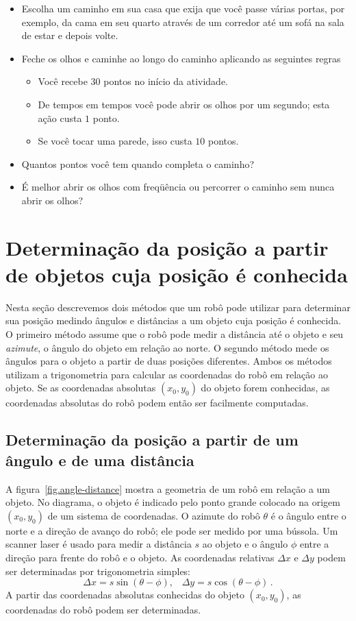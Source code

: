 \begin{framed}
\begin{itemize}
\item Escolha um caminho em sua casa que exija que você passe várias portas, por exemplo, da cama em seu quarto através de um corredor até um sofá na sala de estar e depois volte.
\item Feche os olhos e caminhe ao longo do caminho aplicando as seguintes regras
\begin{itemize}
\item Você recebe $30$ pontos no início da atividade.
\item De tempos em tempos você pode abrir os olhos por um segundo; esta ação custa $1$ ponto.
\item Se você tocar uma parede, isso custa $10$ pontos.
\end{itemize}
\item Quantos pontos você tem quando completa o caminho?
\item É melhor abrir os olhos com freqüência ou percorrer o caminho sem nunca abrir os olhos?
\end{itemize}
\end{framed}

\section{Determinação da posição a partir de objetos cuja posição é conhecida}\label{s.known-points}

Nesta seção descrevemos dois métodos que um robô pode utilizar para determinar sua posição medindo ângulos e distâncias a um objeto cuja posição é conhecida. O primeiro método assume que o robô pode medir a distância até o objeto e seu \emph{azimute}, o ângulo do objeto em relação ao norte. O segundo método mede os ângulos para o objeto a partir de duas posições diferentes. Ambos os métodos utilizam a trigonometria para calcular as coordenadas do robô em relação ao objeto. Se as coordenadas absolutas $(x_0,y_0)$ do objeto forem conhecidas, as coordenadas absolutas do robô podem então ser facilmente computadas.

\subsection{Determinação da posição a partir de um ângulo e de uma distância}

A figura~\ref{fig.angle-distance} mostra a geometria de um robô em relação a um objeto. No diagrama, o objeto é indicado pelo ponto grande colocado na origem $(x_0,y_0)$ de um sistema de coordenadas. O azimute do robô $\theta$ é o ângulo entre o norte e a direção de avanço do robô; ele pode ser medido por uma bússola. Um scanner laser é usado para medir a distância $s$ ao objeto e o ângulo $\phi$ entre a direção para frente do robô e o objeto. As coordenadas relativas $\Delta x$ e $\Delta y$ podem ser determinadas por trigonometria simples:
\[
\Delta x = s \sin (\theta-\phi), \;\;\; \Delta y = s \cos (\theta-\phi)\,.
\]
A partir das coordenadas absolutas conhecidas do objeto $(x_0,y_0)$, as coordenadas do robô podem ser determinadas.

